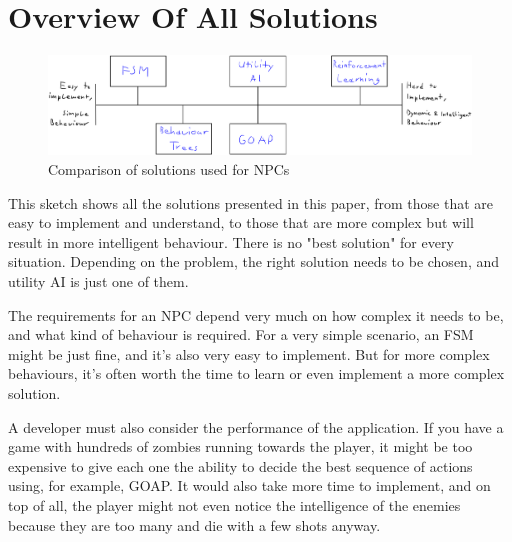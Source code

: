 \newpage

\section{Overview Of All Solutions}
\label{sec:comparisontoothersolutions_overviewofallsolutions}

\begin{figure}[H]
	\centering
		\includegraphics[scale=0.19]{images/comparison_of_ai_solutions.png}
	\caption{Comparison of solutions used for NPCs \cite{Comparison}}
	\label{fig:comparison_of_ai_solutions}
\end{figure}

This sketch shows all the solutions presented in this paper, from those that are easy to implement and understand, to those that are more complex but will result in more intelligent behaviour. There is no "best solution" for every situation. Depending on the problem, the right solution needs to be chosen, and utility AI is just one of them.

The requirements for an NPC depend very much on how complex it needs to be, and what kind of behaviour is required. For a very simple scenario, an FSM might be just fine, and it's also very easy to implement. But for more complex behaviours, it's often worth the time to learn or even implement a more complex solution.

A developer must also consider the performance of the application. If you have a game with hundreds of zombies running towards the player, it might be too expensive to give each one the ability to decide the best sequence of actions using, for example, GOAP. It would also take more time to implement, and on top of all, the player might not even notice the intelligence of the enemies because they are too many and die with a few shots anyway.